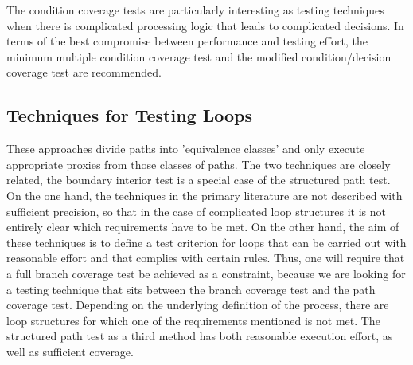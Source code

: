 

	The condition coverage tests are particularly interesting as testing techniques when there is complicated processing logic that leads to complicated decisions. In terms of the best compromise between performance and testing effort, the minimum multiple condition coverage test and the modified condition/decision coverage test are recommended.

	\subsection{Techniques for Testing Loops}


	These approaches divide paths into 'equivalence classes' and only execute appropriate proxies from those classes of paths. The two techniques are closely related, the boundary interior test is a special case of the structured path test. On the one hand, the techniques in the primary literature are not described with sufficient precision, so that in the case of complicated loop structures it is not entirely clear which requirements have to be met. On the other hand, the aim of these techniques is to define a test criterion for loops that can be carried out with reasonable effort and that complies with certain rules. Thus, one will require that a full branch coverage test be achieved as a constraint, because we are looking for a testing technique that sits between the branch coverage test and the path coverage test. Depending on the underlying definition of the process, there are loop structures for which one of the requirements mentioned is not met. The structured path test as a third method has both reasonable execution effort, as well as sufficient coverage.


